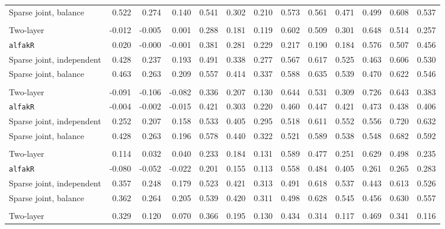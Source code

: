 \begin{center}
\begin{tabular}{l*{12}{r}}
\quad Sparse joint, balance & 0.522 & 0.274 & 0.140 & 0.541 & 0.302 & 0.210 & 0.573 & 0.561 & 0.471 & 0.499 & 0.608 & 0.537 \\
\addlinespace[2pt]
\multicolumn{13}{l}{\textit{500/700, 360 d}} \\
\quad Two-layer & -0.012 & -0.005 & 0.001 & 0.288 & 0.181 & 0.119 & 0.602 & 0.509 & 0.301 & 0.648 & 0.514 & 0.257 \\
\quad \texttt{alfakR} & 0.020 & -0.000 & -0.001 & 0.381 & 0.281 & 0.229 & 0.217 & 0.190 & 0.184 & 0.576 & 0.507 & 0.456 \\
\quad Sparse joint, independent & 0.428 & 0.237 & 0.193 & 0.491 & 0.338 & 0.277 & 0.567 & 0.617 & 0.525 & 0.463 & 0.606 & 0.530 \\
\quad Sparse joint, balance & 0.463 & 0.263 & 0.209 & 0.557 & 0.414 & 0.337 & 0.588 & 0.635 & 0.539 & 0.470 & 0.622 & 0.546 \\
\addlinespace[2pt]
\multicolumn{13}{l}{\textit{500/700, 1080 d}} \\
\quad Two-layer & -0.091 & -0.106 & -0.082 & 0.336 & 0.207 & 0.130 & 0.644 & 0.531 & 0.309 & 0.726 & 0.643 & 0.383 \\
\quad \texttt{alfakR} & -0.004 & -0.002 & -0.015 & 0.421 & 0.303 & 0.220 & 0.460 & 0.447 & 0.421 & 0.473 & 0.438 & 0.406 \\
\quad Sparse joint, independent & 0.252 & 0.207 & 0.158 & 0.533 & 0.405 & 0.295 & 0.518 & 0.611 & 0.552 & 0.556 & 0.720 & 0.632 \\
\quad Sparse joint, balance & 0.428 & 0.263 & 0.196 & 0.578 & 0.440 & 0.322 & 0.521 & 0.589 & 0.538 & 0.548 & 0.682 & 0.592 \\
\addlinespace[2pt]
\multicolumn{13}{l}{\textit{500/700, bottleneck}} \\
\quad Two-layer & 0.114 & 0.032 & 0.040 & 0.233 & 0.184 & 0.131 & 0.589 & 0.477 & 0.251 & 0.629 & 0.498 & 0.235 \\
\quad \texttt{alfakR} & -0.080 & -0.052 & -0.022 & 0.201 & 0.155 & 0.113 & 0.558 & 0.484 & 0.405 & 0.261 & 0.265 & 0.283 \\
\quad Sparse joint, independent & 0.357 & 0.248 & 0.179 & 0.523 & 0.421 & 0.313 & 0.491 & 0.618 & 0.537 & 0.443 & 0.613 & 0.526 \\
\quad Sparse joint, balance & 0.362 & 0.264 & 0.205 & 0.539 & 0.420 & 0.311 & 0.498 & 0.628 & 0.545 & 0.456 & 0.630 & 0.557 \\
\addlinespace[2pt]
\multicolumn{13}{l}{\textit{100/3000, 360 d}} \\
\quad Two-layer & 0.329 & 0.120 & 0.070 & 0.366 & 0.195 & 0.130 & 0.434 & 0.314 & 0.117 & 0.469 & 0.341 & 0.116 \\

\end{tabular}
\end{center}

